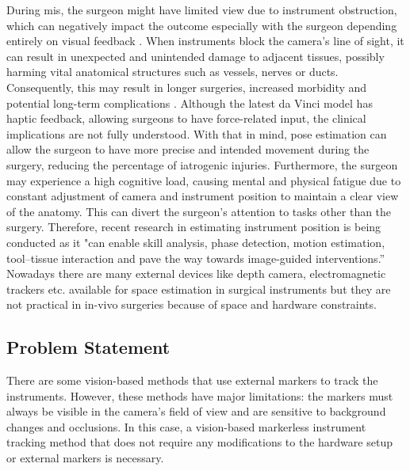 \documentclass[12pt]{article}
\begin{document}
During \gls{mis}, the surgeon might have limited view due to instrument obstruction, which can negatively impact the outcome especially with the surgeon depending entirely on visual feedback \cite{kassahun2016surgical}. When instruments block the camera's line of sight, it can result in unexpected and unintended damage to adjacent tissues, possibly harming vital anatomical structures such as vessels, nerves or ducts. Consequently, this may result in longer surgeries, increased morbidity and potential long-term complications\cite{allan2017visual} \cite{allan20183}. Although the latest da Vinci model has haptic feedback, allowing surgeons to have force-related input\cite{saracino2019haptic}, the clinical implications are not fully understood. With that in mind, pose estimation can allow the surgeon to have more precise and intended movement during the surgery, reducing the percentage of iatrogenic injuries\cite{allan2017visual}\cite{hein2021towards}. Furthermore, the surgeon may experience a high cognitive load, causing mental and physical fatigue due to constant adjustment of camera and instrument position to maintain a clear view of the anatomy\cite{allan20183}\cite{allan2017visual}\cite{shugaba2022should}. This can divert the surgeon's attention to tasks other than the surgery. Therefore, recent research in estimating instrument position is being conducted as it "can enable skill analysis, phase detection, motion estimation, tool–tissue interaction and pave the way towards image-guided interventions.”\cite{hein2021towards} Nowadays there are many external devices like depth camera, electromagnetic trackers etc. available for space estimation in surgical instruments but they are not practical in in-vivo surgeries because of space and hardware constraints\cite{enhancedmarker}.

\subsection{Problem Statement}
There are some vision-based methods that use external markers to track the instruments. However, these methods have major limitations: the markers must always be visible in the camera's field of view and are sensitive to background changes and occlusions\cite{10160287}. In this case, a vision-based markerless instrument tracking method that does not require any modifications to the hardware setup or external markers is necessary. 
\end{document}
